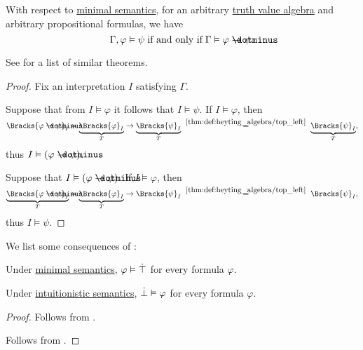 \begin{theorem}\label{thm:propositional_semantic_deduction_theorem}
  With respect to \hyperref[def:minimal_propositional_semantics]{minimal semantics}, for an arbitrary \hyperref[con:truth_value_algebra]{truth value algebra} and arbitrary propositional formulas, we have
  \begin{equation*}
    \Gamma, \varphi \vDash \psi \T{if and only if} \Gamma \vDash \varphi \synimplies \psi.
  \end{equation*}
\end{theorem}
\begin{comments}
  \item See  for a list of similar theorems.
\end{comments}
\begin{proof}
  Fix an interpretation \( I \) satisfying \( \Gamma \).

  \SufficiencySubProof Suppose that from \( I \vDash \varphi \) it follows that \( I \vDash \psi \). If \( I \vDash \varphi \), then
  \begin{equation*}
    \Bracks{\varphi \synimplies \psi}_I
    =
    \underbrace{\Bracks{\varphi}_I}_T \rightarrow \underbrace{\Bracks{\psi}_I}_T
    \reloset {\ref{thm:def:heyting_algebra/top_left}} =
    \underbrace{\Bracks{\psi}_I}_T,
  \end{equation*}
  thus \( I \vDash (\varphi \synimplies \psi) \).

  \NecessitySubProof Suppose that \( I \vDash (\varphi \synimplies \psi) \). If \( I \vDash \varphi \), then
  \begin{equation*}
    \underbrace{\Bracks{\varphi \synimplies \psi}_I}_{T}
    =
    \underbrace{\Bracks{\varphi}_I}_T \rightarrow \Bracks{\psi}_I
    \reloset {\ref{thm:def:heyting_algebra/top_left}} =
    \Bracks{\psi}_I,
  \end{equation*}
  thus \( I \vDash \psi \).
\end{proof}

\begin{corollary}\label{thm:intuitionistic_deduction_consequences}
  We list some consequences of :
  \begin{thmenum}
     Under \hyperref[def:minimal_propositional_semantics]{minimal semantics}, \( \varphi \vDash \dot{\top} \) for every formula \( \varphi \).

     Under \hyperref[def:propositional_semantics/intuitionistic]{intuitionistic semantics}, \( \dot{\bot} \vDash \varphi \) for every formula \( \varphi \).
  \end{thmenum}
\end{corollary}
\begin{proof}
   Follows from .

   Follows from .
\end{proof}

